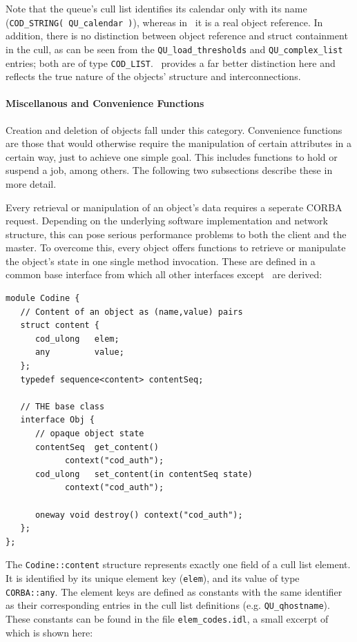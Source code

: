 Note that the queue's cull list identifies its calendar only with its name
(\texttt{COD\_STRING( QU\_calendar )}), whereas in \qidl\ it is a real object
reference. In addition, there is no distinction between object reference and
struct containment in the cull, as can be seen from the
\texttt{QU\_load\_thresholds} and \texttt{QU\_complex\_list} entries; both
are of type \texttt{COD\_LIST}. \qidl\
provides a far better distinction here and reflects the true nature of the
objects' structure and interconnections.

\paragraph{Miscellanous and Convenience Functions\\}
Creation and deletion of objects fall under this category. Convenience
functions are those that would otherwise require the manipulation of certain
attributes in a certain way, just to achieve one simple goal. This
includes functions to hold or suspend a job, among others. The following two
subsections describe these in more detail.

Every retrieval or manipulation of an object's data requires a seperate COR\-BA
request. Depending on the underlying software implementation and network
structure, this can pose serious performance problems to both the client and
the master. To overcome this, every object offers functions to retrieve or
manipulate the object's state in one single method invocation. These are
defined in a common base interface from which all other interfaces except
\master\ are derived:

\begin{Verbatim}[fontsize=\small, frame=single]
module Codine {
   // Content of an object as (name,value) pairs
   struct content {
      cod_ulong   elem;
      any         value;
   };
   typedef sequence<content> contentSeq;

   // THE base class
   interface Obj {
      // opaque object state
      contentSeq  get_content() 
            context("cod_auth");
      cod_ulong   set_content(in contentSeq state) 
            context("cod_auth");
      
      oneway void destroy() context("cod_auth");
   };
};
\end{Verbatim}

The \texttt{Codine::content} structure represents exactly one field of a cull
list element. It is identified by its unique element key (\texttt{elem}), and
its value of type \texttt{CORBA::any}. The element keys are defined as
constants with the same identifier as their corresponding entries in
the cull list definitions (e.g. \texttt{QU\_qhostname}). These constants can
be found in the file \texttt{elem\_codes.idl}, a small excerpt of which is shown
here:

